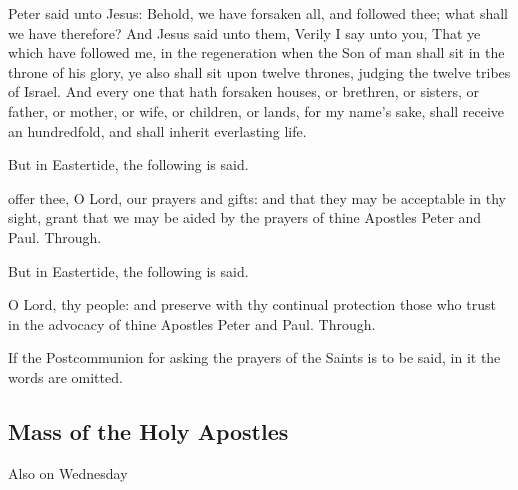  Peter said unto Jesus: Behold, we have forsaken all, and followed thee; what shall we have therefore? And Jesus said unto them, Verily I say unto you, That ye which have followed me, in the regeneration when the Son of man shall sit in the throne of his glory, ye also shall sit upon twelve thrones, judging the twelve tribes of Israel. And every one that hath forsaken houses, or brethren, or sisters, or father, or mother, or wife, or children, or lands, for my name's sake, shall receive an hundredfold, and shall inherit everlasting life.


\begin{rubric}
	But in Eastertide, the following is said.
\end{rubric}


\secret
{} offer thee, O Lord, our prayers and gifts: and that they may be acceptable in thy sight, grant that we may be aided by the prayers of thine Apostles Peter and Paul. Through.


\begin{rubric}
	But in Eastertide, the following is said.
\end{rubric}


\postcommunion
{} O Lord, thy people: and preserve with thy continual protection those who trust in the advocacy of thine Apostles Peter and Paul. Through.

\begin{rubric}
	If the Postcommunion for asking the prayers of the Saints is to be said, in it the words  are omitted.
\end{rubric}


\subsection{Mass of the Holy Apostles}
\begin{inhead}
	Also on Wednesday
\end{inhead}

